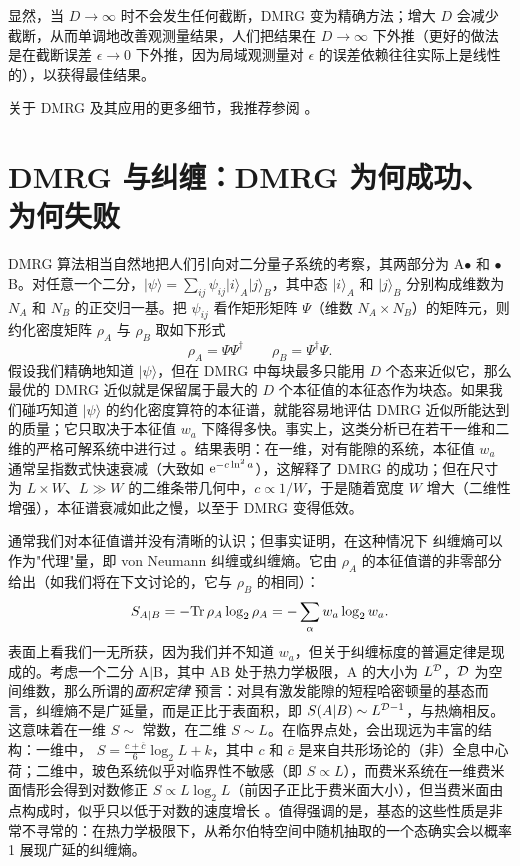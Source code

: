 \documentclass[a4paper,10pt,oneside,onecolumn,1p,times]{elsarticle}
\newcommand{\Tr}{{\rm Tr}}
\newcommand{\eul}{{\rm e }}
\newcommand{\ket}[1]{\mbox{$| #1  \rangle$}}
\begin{document}
显然，当 $D\rightarrow\infty$ 时不会发生任何截断，DMRG 变为精确方法；增大 $D$ 会减少截断，从而单调地改善观测量结果，人们把结果在 $D\rightarrow\infty$ 下外推（更好的做法是在截断误差 $\epsilon\rightarrow 0$ 下外推，因为局域观测量对 $\epsilon$ 的误差依赖往往实际上是线性的），以获得最佳结果。

关于 DMRG 及其应用的更多细节，我推荐参阅 \cite{Schollwoeck05}。
  
\section{DMRG 与纠缠：DMRG 为何成功、为何失败}
DMRG 算法相当自然地把人们引向对二分量子系统的考察，其两部分为 A$\bullet$ 和 $\bullet$B。对任意一个二分，$\ket{\psi} = \sum_{ij} \psi_{ij} \ket{i}_A \ket{j}_B$，其中态 $\ket{i}_A$ 和 $\ket{j}_B$ 分别构成维数为 $N_A$ 和 $N_B$ 的正交归一基。把 $\psi_{ij}$ 看作矩形矩阵 $\Psi$（维数 $N_A \times N_B$）的矩阵元，则约化密度矩阵 $\rho_A$ 与 $\rho_B$ 取如下形式
\begin{equation}
\rho_A = \Psi \Psi^\dagger \quad\quad \rho_B = \Psi^\dagger \Psi.
\label{eq:ABdensityoperators}
\end{equation}
假设我们精确地知道 $\ket{\psi}$，但在 DMRG 中每块最多只能用 $D$ 个态来近似它，那么最优的 DMRG 近似就是保留属于最大的 $D$ 个本征值的本征态作为块态。如果我们碰巧知道 $\ket{\psi}$ 的约化密度算符的本征谱，就能容易地评估 DMRG 近似所能达到的质量；它只取决于本征值 $w_a$ 下降得多快。事实上，这类分析已在若干一维和二维的严格可解系统中进行过 \cite{Peschel99,Okunishi99,Chung00,Chung01,Chan02}。结果表明：在一维，对有能隙的系统，本征值 $w_a$ 通常呈指数式快速衰减（大致如 $\eul^{- c \ln^2 a}$），这解释了 DMRG 的成功；但在尺寸为 $L \times W$、$L\gg W$ 的二维条带几何中，$c \propto 1/W$，于是随着宽度 $W$ 增大（二维性增强），本征谱衰减如此之慢，以至于 DMRG 变得低效。

通常我们对本征值谱并没有清晰的认识；但事实证明，在这种情况下
纠缠熵可以作为"代理"量，即 von Neumann 纠缠或纠缠熵。它由 $\rho_A$ 的本征值谱的非零部分给出（如我们将在下文讨论的，它与 $\rho_B$ 的相同）：
\begin{equation}
S_{A|B}  = - \Tr\, \rho_A \log_2 \rho_A = - \sum_\alpha w_a \log_2 w_a .
\end{equation}
表面上看我们一无所获，因为我们并不知道 $w_a$，但关于纠缠标度的普遍定律是现成的。考虑一个二分 A$|$B，其中 AB 处于热力学极限，A 的大小为 $L^{\cal D}$，${\cal D}$ 为空间维数，那么所谓的{\em 面积定律}
\cite{Eisert10,Bekenstein73,Srednicki93,Callan94,Plenio05} 预言：对具有激发能隙的短程哈密顿量的基态而言，纠缠熵不是广延量，而是正比于表面积，即 $S(A|B) \sim L^{{\cal D}-1}$，与热熵相反。这意味着在一维 $S \sim $ 常数，在二维 $S \sim L$。在临界点处，会出现远为丰富的结构：一维中，
$S = \frac{c+\overline{c}}{6} \log_2 L + k$，其中 $c$ 和 $\overline{c}$ 是来自共形场论的（非）全息中心荷\cite{Vidal03,Latorre04}；二维中，玻色系统似乎对临界性不敏感（即 $S \propto L$）\cite{Srednicki93,Barthel06}，而费米系统在一维费米面情形会得到对数修正 $S \propto L \log_2 L$（前因子正比于费米面大小），但当费米面由点构成时，似乎只以低于对数的速度增长 \cite{Barthel06,Gioev06}。值得强调的是，基态的这些性质是非常不寻常的：在热力学极限下，从希尔伯特空间中随机抽取的一个态确实会以概率 1 展现广延的纠缠熵。
\end{document}
